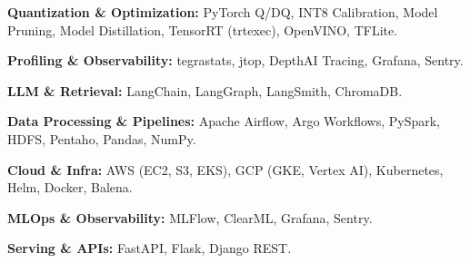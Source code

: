         \begin{onecolentry}
            \textbf{Quantization \& Optimization:} PyTorch Q/DQ, INT8 Calibration, Model Pruning, Model Distillation, TensorRT (trtexec), OpenVINO, TFLite.
        \end{onecolentry}
        \vspace{0.05 cm}

        \begin{onecolentry}
            \textbf{Profiling \& Observability:} tegrastats, jtop, DepthAI Tracing, Grafana, Sentry.
        \end{onecolentry}
        \vspace{0.05 cm}

        \begin{onecolentry}
            \textbf{LLM \& Retrieval:} LangChain, LangGraph, LangSmith, ChromaDB.
        \end{onecolentry}
        \vspace{0.05 cm}

        \begin{onecolentry}
            \textbf{Data Processing \& Pipelines:} Apache Airflow, Argo Workflows, PySpark, HDFS, Pentaho, Pandas, NumPy.
        \end{onecolentry}
        \vspace{0.05 cm}

        \begin{onecolentry}
            \textbf{Cloud \& Infra:} AWS (EC2, S3, EKS), GCP (GKE, Vertex AI), Kubernetes, Helm, Docker, Balena.
        \end{onecolentry}
        \vspace{0.05 cm}

        \begin{onecolentry}
            \textbf{MLOps \& Observability:} MLFlow, ClearML, Grafana, Sentry.
        \end{onecolentry}
        \vspace{0.05 cm}

        \begin{onecolentry}
            \textbf{Serving \& APIs:} FastAPI, Flask, Django REST.
        \end{onecolentry}
        \vspace{0.05 cm}

